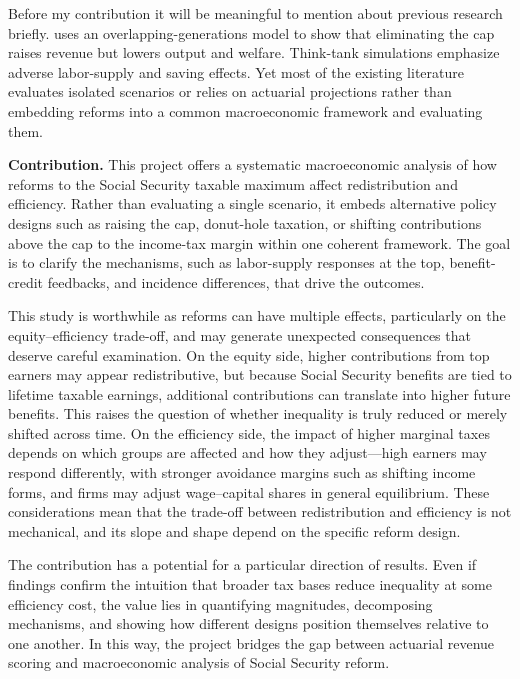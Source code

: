 Before my contribution it will be meaningful to mention about previous research briefly. \citet{Bagchi2017} uses an overlapping-generations model to show that eliminating the cap raises revenue but lowers output and welfare. Think-tank simulations \citep{Heritage2005,Manhattan2024} emphasize adverse labor-supply and saving effects. Yet most of the existing literature evaluates isolated scenarios or relies on actuarial projections rather than embedding reforms into a common macroeconomic framework and evaluating them.  


\textbf{Contribution.} This project offers a systematic macroeconomic analysis of how reforms to the Social Security taxable maximum affect redistribution and efficiency. Rather than evaluating a single scenario, it embeds alternative policy designs such as raising the cap, donut-hole taxation, or shifting contributions above the cap to the income-tax margin within one coherent framework. The goal is to clarify the mechanisms, such as labor-supply responses at the top, benefit-credit feedbacks, and incidence differences, that drive the outcomes.  

This study is worthwhile as reforms can have multiple effects, particularly on the equity–efficiency trade-off, and may generate unexpected consequences that deserve careful examination. On the equity side, higher contributions from top earners may appear redistributive, but because Social Security benefits are tied to lifetime taxable earnings, additional contributions can translate into higher future benefits. This raises the question of whether inequality is truly reduced or merely shifted across time. On the efficiency side, the impact of higher marginal taxes depends on which groups are affected and how they adjust—high earners may respond differently, with stronger avoidance margins such as shifting income forms, and firms may adjust wage–capital shares in general equilibrium. These considerations mean that the trade-off between redistribution and efficiency is not mechanical, and its slope and shape depend on the specific reform design.  

The contribution has a potential for a particular direction of results. Even if findings confirm the intuition that broader tax bases reduce inequality at some efficiency cost, the value lies in quantifying magnitudes, decomposing mechanisms, and showing how different designs position themselves relative to one another. In this way, the project bridges the gap between actuarial revenue scoring and macroeconomic analysis of Social Security reform.  


